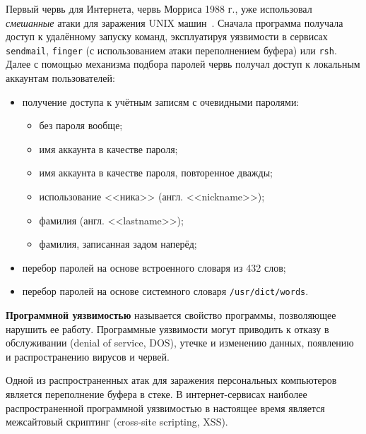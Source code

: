 \documentclass[10pt,a4paper]{book}
\begin{document}
Первый червь для Интернета, червь Морриса 1988 г., уже использовал \emph{смешанные} атаки для заражения UNIX машин~\cite{EichinRochlis:1988}\cite{Spafford:1989}. Сначала программа получала доступ к удалённому запуску команд, эксплуатируя уязвимости в сервисах \texttt{sendmail}, \texttt{finger} (с использованием атаки переполнением буфера) или \texttt{rsh}. Далее с помощью механизма подбора паролей червь получал доступ к локальным аккаунтам пользователей:
\begin{itemize}
    \item получение доступа к учётным записям с очевидными паролями:
		\begin{itemize}
			\item без пароля вообще;
			\item имя аккаунта в качестве пароля;
			\item имя аккаунта в качестве пароля, повторенное дважды;
			\item использование <<ника>> (англ. <<nickname>>);
			\item фамилия (англ. <<lastname>>);
			\item фамилия, записанная задом наперёд;
		\end{itemize}
		\item перебор паролей на основе встроенного словаря из 432 слов;
		\item перебор паролей на основе системного словаря \texttt{/usr/dict/words}.
\end{itemize}

\textbf{Программной уязвимостью} называется свойство программы, позволяющее нарушить ее работу. Программные уязвимости могут приводить к отказу в обслуживании (denial of service, DOS), утечке и изменению данных, появлению и распространению вирусов и червей.

Одной из распространенных атак для заражения персональных компьютеров является переполнение буфера в стеке. В интернет-сервисах наиболее распространенной программной уязвимостью в настоящее время является межсайтовый скриптинг (cross-site scripting, XSS).
\end{document}
